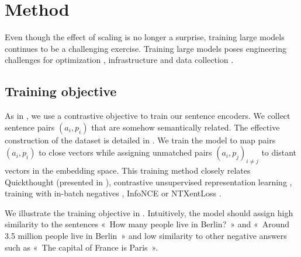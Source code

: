 
\section{Method}

Even though the effect of scaling is no longer a surprise, training large models continues to be a challenging exercise. Training large models poses engineering challenges for optimization \parencite{you_20}, infrastructure \parencite{shoeybi_19, narayanan_21} and data collection \parencite{OrtizSuarezSagotRomary2019}.

\subsection{Training objective}

As in , we use a contrastive objective to train our sentence encoders. We collect sentence pairs $(a_i, p_i)$ that are somehow semantically related. The effective construction of the dataset is detailed in . We train the model to map pairs $(a_i, p_i)$ to close vectors while assigning unmatched pairs $(a_i, p_j)_{i \neq j}$ to distant vectors in the embedding space. This training method closely relates Quickthought (presented in ), contrastive unsupervised representation learning \parencite{saunshi_19}, training with in-batch negatives \parencite{carlsson_21}, InfoNCE \parencite{oord_18} or NTXentLoss \parencite{sohn_16}.

We illustrate the training objective in . Intuitively, the model should assign high similarity to the sentences «~How many people live in Berlin?~» and «~Around 3.5 million people live in Berlin~» and low similarity to other negative answers such as «~The capital of France is Paris~».

